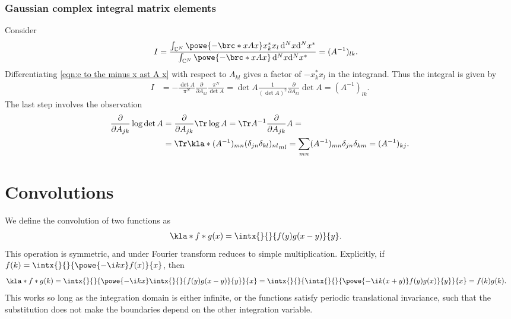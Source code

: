 \documentclass[english, parskip=full]{scrartcl}
\begin{document}
\subsubsection{Gaussian complex integral matrix elements}
Consider
\begin{align}
I &= \frac{\int_{\mathbb{C}^N}^{} \powe{-\brc*{x}{A}{x} } x_k^\ast x_l \,\mathrm{d}^Nx\mathrm{d}^Nx^\ast}{\int_{\mathbb{C}^N}^{} \powe{-\brc*{x}{A}{x} } \,\mathrm{d}^Nx\mathrm{d}^Nx^\ast} = (A^{-1})_{lk}. \label{eqn:e to the minus x ast A x xj xk normalized}
\end{align}
Differentiating \autoref{eqn:e to the minus x ast A x} with respect to $A_{kl}$ gives a factor of $-x_k^\ast x_l$ in the integrand.
Thus the integral is given by
\begin{align}
I &= -\frac{\det A}{\pi^N} \frac{\partial }{\partial A_{kl}} \frac{\pi^N}{ \det A} = \det A \frac{1}{(\det A)^2} \frac{\partial }{\partial A_{kl}} \det A = (A^{-1})_{lk}.
\end{align}
The last step involves the observation
\begin{align}
\frac{\partial}{\partial A_{jk}} \log \det A &= \frac{\partial}{\partial A_{jk}} \Tr \log A = \Tr A^{-1} \frac{\partial}{\partial A_{jk}} A = \\
&= \Tr \kla*{(A^{-1})_{mn} (\delta_{jn} \delta_{kl})_{nl} }_{ml} = \sum_{mn} (A^{-1})_{mn} \delta_{jn} \delta_{km} = (A^{-1})_{kj}.
\end{align}
\section{Convolutions}
We define the convolution of two functions as
\begin{align}
\kla*{f\ast g}(x) &= \intx{ }{ }{f(y)g(x-y)}{y}.
\end{align}
This operation is symmetric, and under Fourier transform reduces to simple multiplication.
Explicitly, if $f(k) = \intx{ }{ }{\powe{-\i kx} f(x)}{x}$, then
\begin{align}
\kla*{f\ast g}(k) &= \intx{ }{ }{\powe{-\i kx} \intx{ }{ }{f(y) g(x-y)}{y} }{x} = \intx{ }{ }{\intx{ }{ }{\powe{-\i k(x+y)} f(y) g(x)}{y}}{x} = f(k)g(k).
\end{align}
This works so long as the integration domain is either infinite, or the functions satisfy periodic translational invariance, such that the substitution does not make the boundaries depend on the other integration variable.
\end{document}

